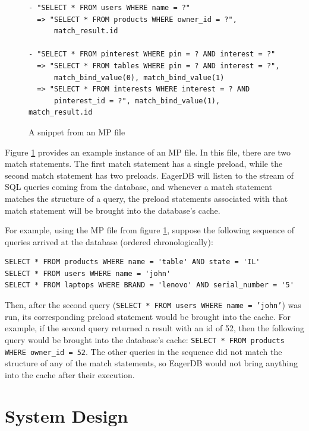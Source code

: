 \documentclass[12pt]{article}
\begin{document}
\begin{figure}[h]
\begin{lstlisting}[frame=single]
- "SELECT * FROM users WHERE name = ?"
  => "SELECT * FROM products WHERE owner_id = ?",
      match_result.id

- "SELECT * FROM pinterest WHERE pin = ? AND interest = ?"
  => "SELECT * FROM tables WHERE pin = ? AND interest = ?",
      match_bind_value(0), match_bind_value(1)
  => "SELECT * FROM interests WHERE interest = ? AND
      pinterest_id = ?", match_bind_value(1), match_result.id
\end{lstlisting}
  \caption{\label{fig:mp-file-example}A snippet from an MP file}
\end{figure}

Figure \ref{fig:mp-file-example} provides an example instance of an MP file. In this file, there are two match statements. The first match statement has a single preload, while the second match statement has two preloads. EagerDB will listen to the stream of SQL queries coming from the database, and whenever a match statement matches the structure of a query, the preload statements associated with that match statement will be brought into the database's cache.

For example, using the MP file from figure \ref{fig:mp-file-example}, suppose the following sequence of queries arrived at the database (ordered chronologically):

\begin{lstlisting}
SELECT * FROM products WHERE name = 'table' AND state = 'IL'
SELECT * FROM users WHERE name = 'john'
SELECT * FROM laptops WHERE BRAND = 'lenovo' AND serial_number = '5'
\end{lstlisting}

Then, after the second query (\texttt{SELECT * FROM users WHERE name = 'john'}) was run, its corresponding preload statement would be brought into the cache. For example, if the second query returned a result with an id of 52, then the following query would be brought into the database's cache: \texttt{SELECT * FROM products WHERE owner\_id = 52}. The other queries in the sequence did not match the structure of any of the match statements, so EagerDB would not bring anything into the cache after their execution.

\section{System Design}
\end{document}
